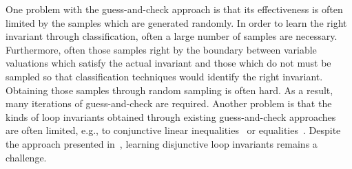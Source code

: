 One problem with the guess-and-check approach is that its effectiveness is often limited by the samples which are generated randomly.
In order to learn the right invariant through classification, often a large number of samples are necessary.
Furthermore, often those samples right by the boundary between variable valuations which satisfy the actual invariant and those which do not must be sampled so that classification techniques would identify the right invariant. Obtaining those samples through random sampling is often hard.
As a result, many iterations of guess-and-check are required. Another problem is that the kinds of loop invariants obtained through existing guess-and-check approaches~\cite{sharma2012interpolants,sharma2013verification,DBLP:conf/esop/0001GHALN13,sharma2014invariant} are often limited, e.g., to conjunctive linear inequalities~\cite{sharma2012interpolants} or equalities~\cite{DBLP:conf/esop/0001GHALN13}. Despite the approach presented in~\cite{DBLP:conf/pldi/GulwaniSV08,DBLP:conf/cav/SharmaDDA11}, learning disjunctive loop invariants remains a challenge.

